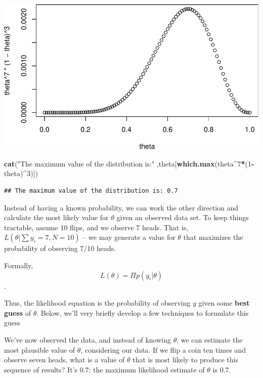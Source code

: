 \documentclass[
]{book}
\newenvironment{Shaded}{\begin{snugshade}}{\end{snugshade}}
\newcommand{\DecValTok}[1]{\textcolor[rgb]{0.00,0.00,0.81}{#1}}
\newcommand{\FunctionTok}[1]{\textcolor[rgb]{0.13,0.29,0.53}{\textbf{#1}}}
\newcommand{\NormalTok}[1]{#1}
\newcommand{\SpecialCharTok}[1]{\textcolor[rgb]{0.81,0.36,0.00}{\textbf{#1}}}
\newcommand{\StringTok}[1]{\textcolor[rgb]{0.31,0.60,0.02}{#1}}
\begin{document}
\includegraphics{_main_files/figure-latex/unnamed-chunk-3-1.pdf}

\begin{Shaded}
\begin{Highlighting}[]
\FunctionTok{cat}\NormalTok{(}\StringTok{"The maximum value of the distribution is:"}\NormalTok{ ,theta[}\FunctionTok{which.max}\NormalTok{(theta}\SpecialCharTok{\^{}}\DecValTok{7}\SpecialCharTok{*}\NormalTok{(}\DecValTok{1}\SpecialCharTok{{-}}\NormalTok{theta)}\SpecialCharTok{\^{}}\DecValTok{3}\NormalTok{)])}
\end{Highlighting}
\end{Shaded}

\begin{verbatim}
## The maximum value of the distribution is: 0.7
\end{verbatim}

Instead of having a known probability, we can work the other direction and calculate the most likely value for \(\theta\) given an observed data set. To keep things tractable, assume 10 flips, and we observe 7 heads. That is, \(L(\theta | \sum y_i=7, N=10)\) -- we may generate a value for \(\theta\) that maximizes the probability of observing 7/10 heads.

Formally,
\[L(\theta)=\Pi p(y_i | \theta)\].

Thus, the likelihood equation is the probability of observing \(y\) given some \textbf{best guess} of \(\theta\). Below, we'll very briefly develop a few techniques to formulate this guess

We've now observed the data, and instead of knowing \(\theta\), we can estimate the most plausible value of \(\theta\), considering our data. If we flip a coin ten times and observe seven heads, what is a value of \(\theta\) that is most likely to produce this sequence of results? It's 0.7; the maximum likelihood estimate of \(\theta\) is 0.7.
\end{document}
